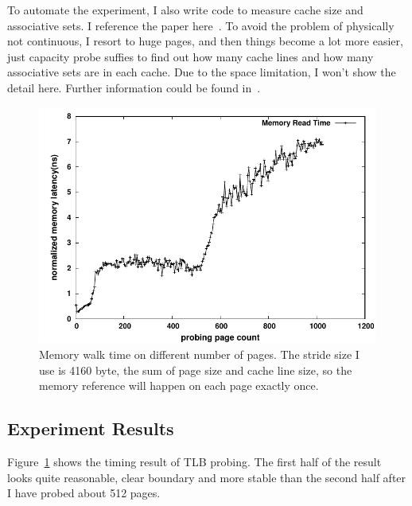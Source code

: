 To automate the experiment, I also write code to measure cache size and
associative sets. I reference the paper here~\cite{sigmetrics:cache}. To avoid
the problem of physically not continuous, I resort to huge pages, and then things
become a lot more easier, just capacity probe suffies to find out how many
cache lines and how many associative sets are in each cache. Due to the space limitation, I won't show the detail here. Further information could be found in~\cite{github}.

\begin{figure}[hpb]
\centering
\includegraphics[width=0.9\linewidth]{../figures/time}
\caption{Memory walk time on different number of pages. The stride size I use is 4160 byte, the sum of page size and cache line size, so the memory reference will happen on each page exactly once.}
\label{fig:tlbsz-time}
\end{figure}

\subsection{Experiment Results}

%
%
%
%
Figure~\ref{fig:tlbsz-time} shows the timing result of TLB probing. The first
half of the result looks quite reasonable, clear boundary and more stable
than the second half after I have probed about 512 pages.

